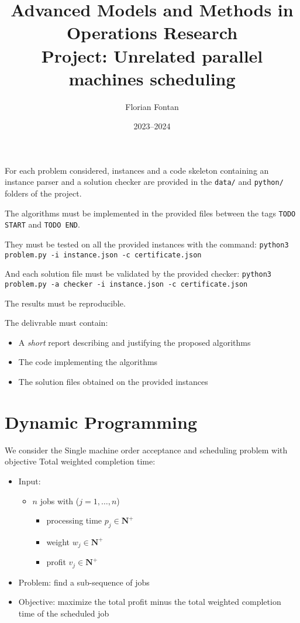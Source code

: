 \documentclass[a4paper,twocolumn]{article}
\author{Florian Fontan}
\title{Advanced Models and Methods in Operations Research \\ Project: Unrelated parallel machines scheduling}
\date{2023--2024}
\newcommand{\N}{\mathbf{N}}
\begin{document}
\maketitle

For each problem considered, instances and a code skeleton containing an instance parser and a solution checker are provided in the \texttt{data/} and \texttt{python/} folders of the project.

The algorithms must be implemented in the provided files between the tags \texttt{TODO START} and \texttt{TODO END}.

They must be tested on all the provided instances with the command:
\texttt{python3 problem.py -i instance.json -c certificate.json}

And each solution file must be validated by the provided checker:
\texttt{python3 problem.py -a checker -i instance.json -c certificate.json}

The results must be reproducible.

\bigskip

The delivrable must contain:
\begin{itemize}
  \item A \emph{short} report describing and justifying the proposed algorithms
  \item The code implementing the algorithms
  \item The solution files obtained on the provided instances
\end{itemize}

\section{Dynamic Programming}

We consider the Single machine order acceptance and scheduling problem with objective Total weighted completion time:
\begin{itemize}
  \item Input:
    \begin{itemize}
      \item $n$ jobs with ($j = 1, \dots, n$)
        \begin{itemize}
          \item processing time $p_j \in \N^+$
          \item weight $w_j \in \N^+$
          \item profit $v_j \in \N^+$
        \end{itemize}
    \end{itemize}
  \item Problem: find a sub-sequence of jobs
  \item Objective: maximize the total profit minus the total weighted completion time of the scheduled job
\end{itemize}
\end{document}
